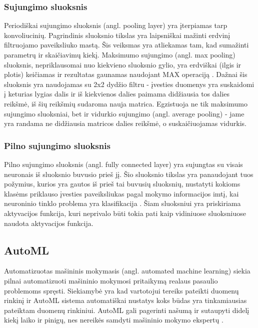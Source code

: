 \documentclass{VUMIFPSbakalaurinis}
\begin{document}
\subsubsection{Sujungimo sluoksnis}
Periodiškai sujungimo sluoksnis (angl. pooling layer) yra įterpiamas tarp konvoliucinių. Pagrindinis sluoksnio tikslas yra laipsniškai mažinti erdvinį filtruojamo paveiksliuko mastą.
Šis veiksmas yra atliekamas tam, kad sumažinti parametrų ir skaičiavimų kiekį. Maksimumo sujungimo (angl. max pooling) sluoksnis, nepriklausomai nuo kiekvieno
sluoksnio gylio, yra erdviškai (ilgis ir plotis) keičiamas ir rezultatas gaunamas naudojant MAX operaciją \cite{7927440}. Dažnai šis sluoksnis yra naudojamas su 2x2 dydžio filtru - įvesties 
duomenys yra suskaidomi į keturias lygias dalis ir iš kiekvienos dalies paimama didžiausia tos dalies reikšmė, iš šių reikšmių sudaroma nauja matrica. Egzistuoja ne tik 
maksimumo sujungimo sluoksniai, bet ir vidurkio sujungimo (angl. average pooling) - jame yra randama ne didžiausia matricos dalies reikšmė, o suskaičiuojamas vidurkis.

\subsubsection{Pilno sujungimo sluoksnis}
Pilno sujungimo sluoksnis (angl. fully connected layer) yra sujungtas su visais 
neuronais iš sluoksnio buvusio prieš jį. Šio sluoksnio tikslas yra panaudojant tuos požymius, kurios yra gautos iš prieš tai buvusių sluoksnių, nustatyti kokioms 
klasėms priklauso įvesties paveiksliukas pagal mokymo informacijos imtį, kai neuroninio tinklo problema yra klasifikacija \cite{Sinha2018InterweavingC}. Šiam 
sluoksniui yra priskiriama aktyvacijos funkcija, kuri neprivalo būti tokia pati kaip vidiniuose sluoksniuose naudota aktyvacijos funkcija. 

\subsection{AutoML}

Automatizuotas mašininis mokymasis (angl. automated machine learning) siekia pilnai automatizuoti mašininio mokymosi pritaikymą realaus pasaulio problemoms spręsti. Siekiamybė yra kad vartotojui tereiks pateikti duomenų rinkinį ir AutoML sistema automatiškai nustatys koks būdas yra tinkamiausias pateiktam duomenų rinkiniui. AutoML gali pagerinti našumą ir sutaupyti didelį kiekį laiko ir pinigų, nes nereikės samdyti mašininio mokymo ekspertų \cite{14f00e7a0861477a81f65b5c51f660f4}.
\end{document}
